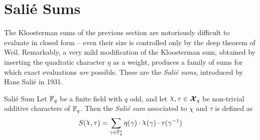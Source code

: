 \section{Sali\'{e} Sums}\label{sec:salie}
The Kloosterman sums of the previous section are notoriously difficult to evaluate in closed form -- even their size is controlled only by the deep theorem of Weil. Remarkably, a very mild modification of the Kloosterman sum, obtained by inserting the quadratic character $\eta$ as a weight, produces a family of sums for which exact evaluations \emph{are} possible. These are the \emph{Sali\'{e} sums}, introduced by Hans Sali\'{e} in 1931.
\begin{Definition}{Sali\'{e} Sum}{}
  Let $\mathbb{F}_q$ be a finite field with $q$ odd, and let $\chi,\tau\in\Xq$ be non-trivial additive characters of $\mathbb{F}_q$. Then the \emph{Sali\'{e} sum} associated to $\chi$ and $\tau$ is defined as $$S(\chi,\tau)=\sum_{\gm\in\bbF_q^*}\eta(\gm)\cdot \chi(\gm)\cdot \tau(\gm^{-1})$$
\end{Definition}

